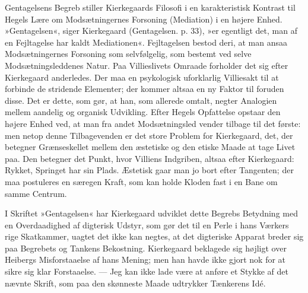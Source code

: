\documentclass[12pt,a4paper,openany]{book}
\newcommand{\opage}[1]{\marginnote{\footnotesize\textit{[#1]}}}
\begin{document}
Gentagelsens Begreb stiller Kierkegaards Filosofi i
en karakteristisk Kontrast til Hegels Lære om Modsætningernes
Forsoning (Mediation) i en højere Enhed. »Gentagelsen«,
siger Kierkegaard (Gentagelsen. p. 33), »er
egentligt det, man af en Fejltagelse har kaldt Mediationen«.
Fejltagelsen bestod deri, at man ansaa Modsætningernes
Forsoning som selvfølgelig, som bestemt ved selve Modsætningsleddenes
Natur. Paa Villieslivets Omraade forholder
det sig efter Kierkegaard anderledes. Der maa
en psykologisk uforklarlig Villiesakt til at forbinde de
stridende Elementer; der kommer altsaa en ny Faktor til
\opage{96}foruden disse. Det er dette, som gør, at han, som allerede
omtalt, negter Analogien mellem aandelig og organisk
Udvikling. Efter Hegels Opfattelse opstaar den
højere Enhed ved, at man fra andet Modsætningsled vender
tilbage til det første: men netop denne Tilbagevenden er
det store Problem for Kierkegaard, det, der betegner
Grænseskellet mellem den æstetiske og den etiske Maade
at tage Livet paa. Den betegner det Punkt, hvor Villiens
Indgriben, altsaa efter Kierkegaard: Rykket, Springet
har sin Plads. Æstetisk gaar man jo bort efter Tangenten;
der maa postuleres en særegen Kraft, som kan
holde Kloden fast i en Bane om samme Centrum.

I Skriftet »Gentagelsen« har Kierkegaard udviklet
dette Begrebs Betydning med en Overdaadighed af digterisk
Udstyr, som gør det til en Perle i hans Værkers
rige Skatkammer, uagtet det ikke kan negtes, at det
digteriske Apparat breder sig paa Begrebets og Tankens
Bekostning. Kierkegaard beklagede sig højligt over Heibergs
Misforstaaelse af hans Mening; men han havde
ikke gjort nok for at sikre sig klar Forstaaelse. --- Jeg
kan ikke lade være at anføre et Stykke af det nævnte
Skrift, som paa den skønneste Maade udtrykker Tænkerens
Idé.
\end{document}
